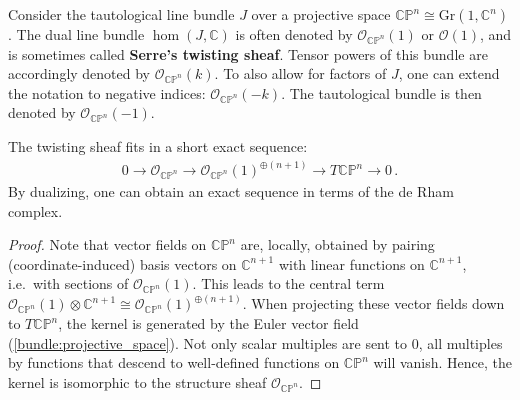     \begin{definition}
        Consider the tautological line bundle $J$ over a projective space $\mathbb{C}\mathbb{P}^n\cong\mathrm{Gr}(1,\mathbb{C}^n)$. The dual line bundle $\hom(J,\mathbb{C})$ is often denoted by $\mathcal{O}_{\mathbb{CP}^n}(1)$ or $\mathcal{O}(1)$, and is sometimes called \textbf{Serre's twisting sheaf}. Tensor powers of this bundle are accordingly denoted by $\mathcal{O}_{\mathbb{CP}^n}(k)$. To also allow for factors of $J$, one can extend the notation to negative indices: $\mathcal{O}_{\mathbb{CP}^n}(-k)$. The tautological bundle is then denoted by $\mathcal{O}_{\mathbb{CP}^n}(-1)$.
    \end{definition}

    \begin{property}
        The twisting sheaf fits in a short exact sequence:
        \begin{gather}
            0\longrightarrow\mathcal{O}_{\mathbb{CP}^n}\longrightarrow\mathcal{O}_{\mathbb{CP}^n}(1)^{\oplus(n+1)}\longrightarrow T\mathbb{CP}^n\longrightarrow0\,.
        \end{gather}
        By dualizing, one can obtain an exact sequence in terms of the de Rham complex.
        \begin{mdframed}[roundcorner=10pt, linecolor=blue, linewidth=1pt]
            \begin{proof}
                Note that vector fields on $\mathbb{CP}^n$ are, locally, obtained by pairing (coordinate-induced) basis vectors on $\mathbb{C}^{n+1}$ with linear functions on $\mathbb{C}^{n+1}$, i.e.~with sections of $\mathcal{O}_{\mathbb{CP}^n}(1)$. This leads to the central term $\mathcal{O}_{\mathbb{CP}^n}(1)\otimes\mathbb{C}^{n+1}\cong\mathcal{O}_{\mathbb{CP}^n}(1)^{\oplus(n+1)}$. When projecting these vector fields down to $T\mathbb{CP}^n$, the kernel is generated by the Euler vector field (\cref{bundle:projective_space}). Not only scalar multiples are sent to 0, all multiples by functions that descend to well-defined functions on $\mathbb{CP}^n$ will vanish. Hence, the kernel is isomorphic to the structure sheaf $\mathcal{O}_{\mathbb{CP}^n}$.


\end{proof}
\end{mdframed}
\end{property}
